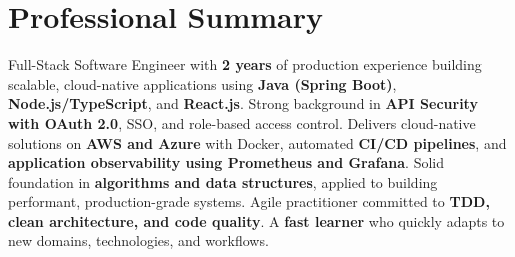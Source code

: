 \section{Professional Summary}
  \small{Full-Stack Software Engineer with \textbf{2 years} of production experience building scalable, cloud-native applications using \textbf{Java (Spring Boot)}, \textbf{Node.js/TypeScript}, and \textbf{React.js}. Strong background in \textbf{API Security with OAuth 2.0}, SSO, and role-based access control. Delivers cloud-native solutions on \textbf{AWS and Azure} with Docker, automated \textbf{CI/CD pipelines}, and \textbf{application observability using Prometheus and Grafana}. Solid foundation in \textbf{algorithms and data structures}, applied to building performant, production-grade systems. Agile practitioner committed to \textbf{TDD, clean architecture, and code quality}. A \textbf{fast learner} who quickly adapts to new domains, technologies, and workflows.}
